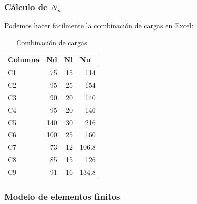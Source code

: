 \documentclass[../main.tex]{subfiles}
\begin{document}
\subsubsection{Cálculo de $N_u$}

Podemos hacer facilmente la combinación de cargas en Excel:

\begin{table}[htbp]
  \centering
  \caption{Combinación de cargas}
    \begin{tabular}{|l|r|r|r|}
    \hline
    \rowcolor[rgb]{ .851,  .851,  .851} \textbf{Columna} & \multicolumn{1}{l|}{\textbf{Nd}} & \multicolumn{1}{l|}{\textbf{Nl}} & \multicolumn{1}{l|}{\textbf{Nu}} \bigstrut\\
    \hline
    C1    & 75    & 15    & 114 \bigstrut\\
    \hline
    C2    & 95    & 25    & 154 \bigstrut\\
    \hline
    C3    & 90    & 20    & 140 \bigstrut\\
    \hline
    C4    & 95    & 20    & 146 \bigstrut\\
    \hline
    C5    & 140   & 30    & 216 \bigstrut\\
    \hline
    C6    & 100   & 25    & 160 \bigstrut\\
    \hline
    C7    & 73    & 12    & 106.8 \bigstrut\\
    \hline
    C8    & 85    & 15    & 126 \bigstrut\\
    \hline
    C9    & 91    & 16    & 134.8 \bigstrut\\
    \hline
    \end{tabular}%
  \label{tab:addlabel}%
\end{table}%


\subsubsection{Modelo de elementos finitos}
\end{document}
